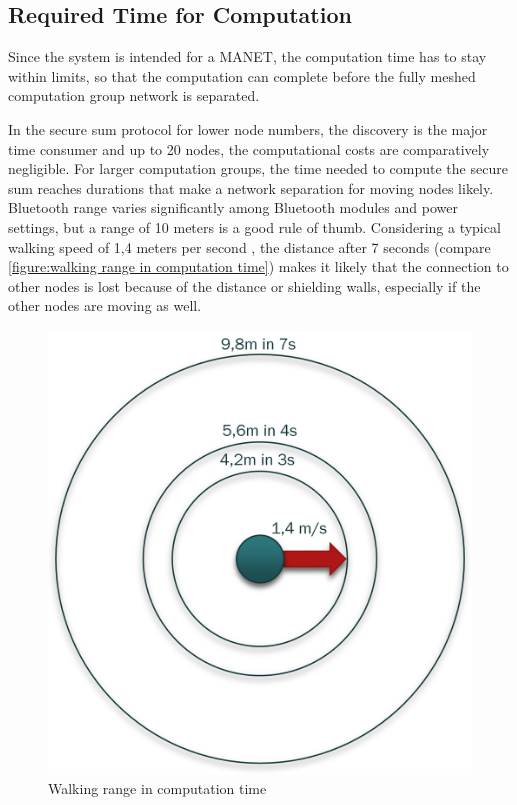 \subsection{Required Time for Computation}

Since the system is intended for a \gls{MANET}, the computation time has to stay within limits, so that the computation can complete before the fully meshed computation group network is separated.

In the secure sum protocol for lower node numbers, the discovery is the major time consumer and up to 20 nodes, the computational costs are comparatively negligible. For larger computation groups, the time needed to compute the secure sum reaches durations that make a network separation for moving nodes likely. Bluetooth range varies significantly among Bluetooth modules and power settings, but a range of 10 meters is a good rule of thumb. Considering a typical walking speed of 1,4 meters per second \autocite{Mohler2007}, the distance after 7 seconds (compare \autoref{figure:walking range in computation time}) makes it likely that the connection to other nodes is lost because of the distance or shielding walls, especially if the other nodes are moving as well.

\begin{figure}[!htbp] %
	\caption{Walking range in computation time} \label{figure:walking range in computation time}
	\includegraphics[scale=1.0]{figures/walking_range.png}
\end{figure}

